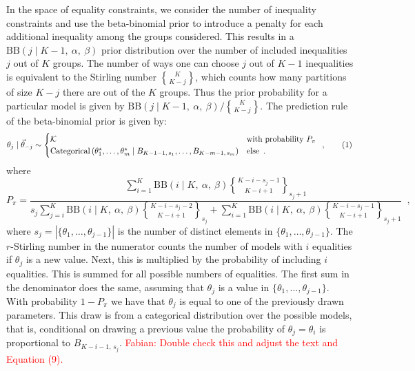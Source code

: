 \documentclass[11pt,a4paper]{article}
\theoremstyle{definition} %
\theoremstyle{case}
\newcommand{\BetaBinom}[4]{\text{BB}\left(#1 \mid #2 ,\ #3 ,\ #4 \right)}
\DeclareRobustCommand{\stirling}{\genfrac\{\}{0pt}{}}
\newcommand{\rstirling}[3]{\stirling{#1}{#2}_{#3}}
\newcommand{\rbellnum}[2]{B_{#1,\,#2}}
\newcommand{\setsize}[1]{|{#1}|}
\newcommand{\numberthis}{\addtocounter{equation}{1}\tag{\theequation}}
\newcommand{\FD}[1]{\textcolor{red}{Fabian: #1 }}
\begin{document}
In the space of equality constraints, we consider the number of inequality constraints and use the beta-binomial prior to introduce a penalty for each additional inequality among the groups considered. This results in a $\BetaBinom{j}{K-1}{\alpha}{\beta}$ prior distribution over the number of included inequalities $j$ out of $K$ groups. The number of ways one can choose $j$ out of $K-1$ inequalities is equivalent to the Stirling number $\stirling{K}{K-j}$, which counts how many partitions of size $K - j$ there are out of the $K$ groups. Thus the prior probability for a particular model is given by $\BetaBinom{j}{K-1}{\alpha}{\beta} / \stirling{K}{K-j}$. The prediction rule of the beta-binomial prior is given by:
\begin{equation}
    \theta_j \mid \vec{\theta}_{-j} \sim \begin{cases}
    \mathcal{K} & \text{with probability } P_{\pi} \\
    \text{Categorical}\left(\theta_1^{\star}, \ldots, \theta_m^{\star} \mid \rbellnum{K - 1 - 1}{s_1}, \ldots, \rbellnum{K - m - 1}{s_m}\right) & \text{else} \enspace .
    \end{cases} \enspace , \numberthis
\end{equation}
where
\begin{equation}
    P_{\pi} = \frac{
        \sum_{i=1}^K \BetaBinom{i}{K}{\alpha}{\beta} \rstirling{K-i-s_j-1}{K-i+1}{s_j + 1}
    }{
        s_j \sum_{j=i}^K \BetaBinom{i}{K}{\alpha}{\beta} \rstirling{K-i-s_j-2}{K-i+1}{s_j} +
          \sum_{i=1}^K \BetaBinom{i}{K}{\alpha}{\beta} \rstirling{K-i-s_j-1}{K-i+1}{s_j + 1}
    } \enspace ,
\end{equation}
where $s_j = \setsize{\{\theta_1, \ldots, \theta_{j - 1}\}}$ is the number of distinct elements in $\{\theta_1, \ldots, \theta_{j - 1}\}$. The $r$-Stirling number in the numerator counts the number of models with $i$ equalities if $\theta_j$ is a new value. Next, this is multiplied by the probability of including $i$ equalities. This is summed for all possible numbers of equalities. 
The first sum in the denominator does the same, assuming that $\theta_j$ is a value in $\{\theta_1, \dots, \theta_{j-1}\}$. With probability $1 - P_{\pi}$ we have that $\theta_j$ is equal to one of the previously drawn parameters. This draw is from a categorical distribution over the possible models, that is, conditional on drawing a previous value the probability of $\theta_j = \theta_i$ is proportional to $\rbellnum{K-i-1}{s_j}$. \FD{Double check this and adjust the text and Equation (9).}
\end{document}
